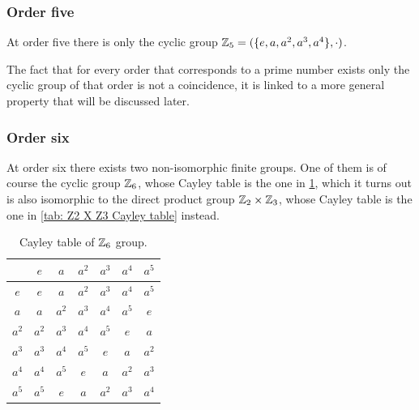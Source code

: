 \subsubsection{Order five}
At order five there is only the cyclic group $\mathbb{Z}_5 = (\{e,a,a^2,a^3,a^4\},\cdot)$.
\begin{obs}
    The fact that for every order that corresponds to a prime number exists only the cyclic group of that order is not a coincidence, it is linked to a more general property that will be discussed later. 
\end{obs}
 
\subsubsection{Order six}
At order six there exists two non-isomorphic finite groups. One of them is of course the cyclic group $\mathbb{Z}_6$, whose Cayley table is the one in \ref{tab: Z6 Cayley table}, which it turns out is also isomorphic to the direct product group $\mathbb{Z}_2 \times \mathbb{Z}_3$, whose Cayley table is the one in \ref{tab: Z2 X Z3 Cayley table} instead. 
\begin{table}[h]
    \centering
    \begin{tabular}{|c|cccccc|}
        \hline 
         & $e$ & $a$ & $a^2$ & $a^3$ & $a^4$ & $a^5$ \\ \hline
         $e$   & $e$   & $a$   & $a^2$ & $a^3$ & $a^4$ & $a^5$ \\ 
         $a$   & $a$   & $a^2$ & $a^3$ & $a^4$ & $a^5$ & $e$ \\
         $a^2$ & $a^2$ & $a^3$ & $a^4$ & $a^5$ & $e$   & $a$ \\ 
         $a^3$ & $a^3$ & $a^4$ & $a^5$ & $e$   & $a$   & $a^2$ \\ 
         $a^4$ & $a^4$ & $a^5$ & $e$   & $a$   & $a^2$ & $a^3$ \\ 
         $a^5$ & $a^5$ & $e$   & $a$   & $a^2$ & $a^3$ & $a^4$ \\ \hline
    \end{tabular}
    \caption{Cayley table of $\mathbb{Z}_6$ group.}
    \label{tab: Z6 Cayley table}
\end{table}

